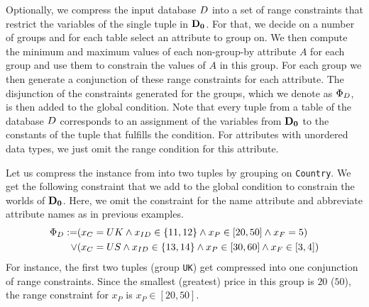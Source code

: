 Optionally, we compress the input database $D$ into a set of range constraints that restrict the variables of the single tuple in $\mathbf{D_0}$. For that, we decide on a number of groups and for each table select an attribute to group on. We then compute the minimum and maximum values of each non-group-by attribute $A$ for each group and use them to constrain the values of $A$ in this group. For each group we then generate a conjunction of these range constraints for each attribute. The  disjunction of the constraints generated for the groups, which we denote as $\Phi_{D}$, is then added to the global condition. Note that every tuple from a table of the database $D$ corresponds to an assignment of the variables from $\mathbf{D_0}$ to the constants of the tuple that fulfills the condition. For attributes with unordered data types, we just omit the range condition for this attribute.

\begin{exam}\label{ex:compressing-databases}
Let us compress the instance from   into two tuples by grouping on \texttt{Country}. We get the following constraint that we add to the global condition to constrain the worlds of $\mathbf{D_0}$. Here, we omit the constraint for the name attribute and abbreviate attribute names as in previous examples.
%
  \begin{align*}
    \Phi_{D}  := &(x_{C} = UK \land x_{ID} \in \{11,12\} \land
    x_{P} \in [20,50] \land
    x_{F} = 5)\\
    \lor &(x_{C} = US \land x_{ID} \in \{13,14\}
           \land
          x_{P} \in [30,60] \land
          x_{F} \in [3,4])
  \end{align*}
For instance, the first two tuples (group \texttt{UK}) get compressed into one conjunction of range constraints. Since the smallest (greatest) price in this group is $20$ ($50$), the range constraint for $x_{P}$ is $x_{P}  \in [20,50]$.
\end{exam}


